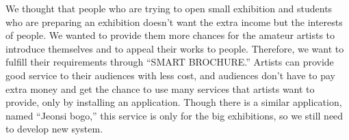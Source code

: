 \documentclass[conference]{IEEEtran}
\begin{document}
 We thought that people who are trying to open small exhibition and students who are preparing an exhibition doesn’t want the extra income but the interests of people. We wanted to provide them more chances for the amateur artists to introduce themselves and to appeal their works to people. Therefore, we want to fulfill their requirements through “SMART BROCHURE.” Artists can provide good service to their audiences with less cost, and audiences don’t have to pay extra money and get the chance to use many services that artists want to provide, only by installing an application. 
Though there is a similar application, named “Jeonsi bogo,” this service is only for the big exhibitions, so we still need to develop new system.\\\\\\\\\\\\\\\\\\\\\\\\\\\\\\\\\\\\\\\\\\\\\\\\\\\\\\\\\\\\\\\\\\\\\\\\\\\\\\\\\\\\\\\\\\\\\\\\\\
\end{document}
